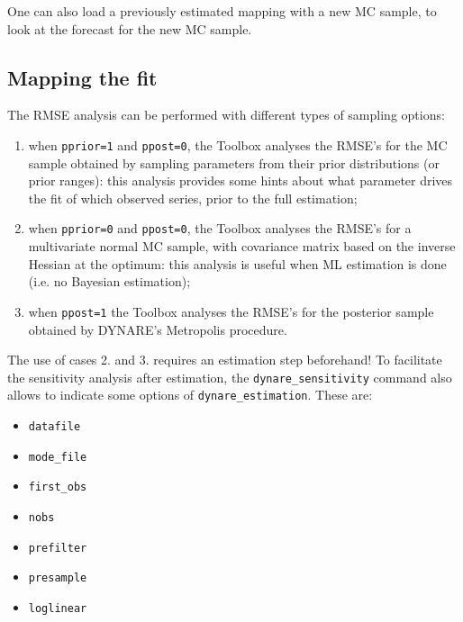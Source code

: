 \documentclass[12pt,a4paper]{article}
\begin{document}
One can also load a previously estimated mapping
with a new MC sample, to look at the forecast for the new MC sample.\\

\subsection{Mapping the fit}
The RMSE analysis can be performed with different types of
sampling options:
\begin{enumerate}
\item when \verb"pprior=1" and \verb"ppost=0", the Toolbox analyses the RMSE's for
the MC sample obtained by sampling parameters from their prior
distributions (or prior ranges): this analysis provides some hints
about what parameter drives the fit of which observed series,
prior to the full estimation;
\item when \verb"pprior=0" and \verb"ppost=0", the Toolbox analyses the RMSE's for
a multivariate normal MC sample, with covariance matrix based on
the inverse Hessian at the optimum: this analysis is useful when
ML estimation is done (i.e. no Bayesian estimation);
\item when \verb"ppost=1" the Toolbox analyses
the RMSE's for the posterior sample obtained by DYNARE's
Metropolis procedure.
\end{enumerate}

The use of cases 2. and 3. requires an estimation step beforehand!
To facilitate the sensitivity analysis after estimation, the
\verb"dynare_sensitivity" command also allows to indicate some
options of \verb"dynare_estimation". These are:
\begin{itemize}
  \item \verb"datafile"
  \item \verb"mode_file"
  \item \verb"first_obs"
  \item \verb"nobs"
  \item \verb"prefilter"
  \item \verb"presample"
  \item \verb"loglinear"
\end{itemize}


 \vspace{1cm}
\end{document}
